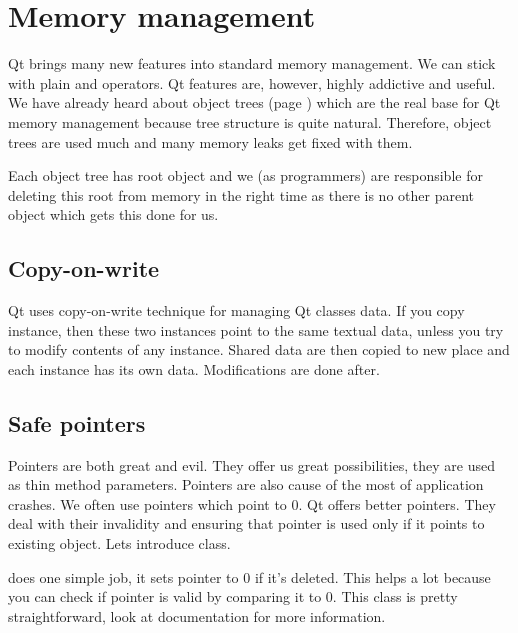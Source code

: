 \chapter{Memory management}\label{section:memorym}
Qt brings many new features into standard \cpp{} memory management. We can stick with plain and operators. Qt features are, however, highly addictive and useful. We have already heard about object trees (page \pageref{section:model}) which are the real base for Qt memory management because tree structure is quite natural. Therefore, object trees are used much and many memory leaks get fixed with them.

Each object tree has root object and we (as programmers) are responsible for deleting this root from memory in the right time as there is no other parent object which gets this done for us.

\section{Copy-on-write}
Qt uses copy-on-write technique for managing Qt classes data. If you copy instance, then these two instances point to the same textual data, unless you try to modify contents of any instance. Shared data are then copied to new place and each instance has its own data. Modifications are done after. 

\section{Safe pointers}
Pointers are both great and evil. They offer us great possibilities, \eg they are used as thin method parameters. Pointers are also cause of the most of application crashes. We often use pointers which point to 0. Qt offers better pointers. They deal with their invalidity and ensuring that pointer is used only if it points to existing object. Lets introduce class. \citep[QPointer class]{various:qtdoc}

 does one simple job, it sets pointer to 0 if it's deleted. This helps a lot because you can check if pointer is valid by comparing it to 0. This class is pretty straightforward, look at documentation for more information.